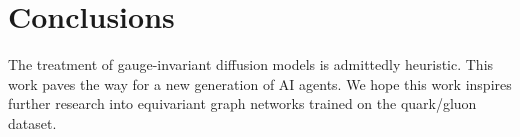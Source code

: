 \section{Conclusions}\label{sec:conclusions}

The treatment of gauge-invariant diffusion models is admittedly
heuristic. This work paves the way for a new generation of AI agents. We
hope this work inspires further research into equivariant graph networks
trained on the quark/gluon dataset.

